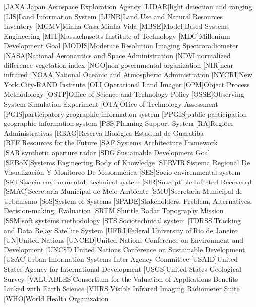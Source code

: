 \begin{acronym}[HyperLEAVES]
[JAXA]{Japan Aerospace Exploration Agency}
[LIDAR]{light detection and ranging}
[LIS]{Land Information System}
[LUNR]{Land Use and Natural Resources Inventory}
[MCMV]{Minha Casa Minha Vida}
[MBSE]{Model-Based Systems Engineering}
[MIT]{Massachusetts Institute of Technology}
[MDG]{Millenium Development Goal}
[MODIS]{Moderate Resolution Imaging Spectroradiometer}
[NASA]{National Aeronautics and Space Administration}
[NDVI]{normalized difference vegetation index}
[NGO]{non-governmental organization}
[NIR]{near infrared}
[NOAA]{National Oceanic and Atmospheric Administration}
[NYCRI]{New York City-RAND Institute}
[OLI]{Operational Land Imager}
[OPM]{Object Process Methodology}
[OSTP]{Office of Science and Technology Policy}
[OSSE]{Observing System Simulation Experiment}
[OTA]{Office of Technology Assessment}
[PGIS]{participatory geographic information system}
[PPGIS]{public participation geographic information system}
[PSS]{Planning Support System}
[RA]{Regiões Administrativas}
[RBAG]{Reserva Biológica Estadual de Guaratiba}
[RFF]{Resources for the Future}
[SAF]{Systems Architecture Framework}
[SAR]{synthetic aperture radar}
[SDG]{Sustainable Development Goal}
[SEBoK]{Systems Engineering Body of Knowledge}
[SERVIR]{Sistema Regional De Visualizaci\'{o}n Y Monitoreo De Mesoam\'{e}rica}
[SES]{Socio-environmental system}
[SETS]{socio-environmental-
technical system}
[SIR]{Susceptible-Infected-Recovered}
[SMAC]{Secretaria Municipal de Meio Ambiente}
[SMU]{Secretaria Municipal de Urbanismo}
[SoS]{System of Systems}
[SPADE]{Stakeholders, Problem, Alternatives, Decision-making, Evaluation}
[SRTM]{Shuttle Radar Topography Mission}
[SSM]{soft systems methodology}
[STS]{Sociotechnical system}
[TDRSS]{Tracking and Data Relay Satellite System}
[UFRJ]{Federal University of Rio de Janeiro}
[UN]{United Nations}
[UNCED]{United Nations Conference on Environment and Development}
[UNCSD]{United Nations Conference on Sustainable Development}
[USAC]{Urban Information Systems Inter-Agency Committee}
[USAID]{United States Agency for International Development}
[USGS]{United States Geological Survey}
[VALUABLES]{Consortium for the Valuation of Applications Benefits Linked with Earth Science}
[VIIRS]{Visible Infrared Imaging Radiometer Suite}
[WHO]{World Health Organization}






\end{acronym}
